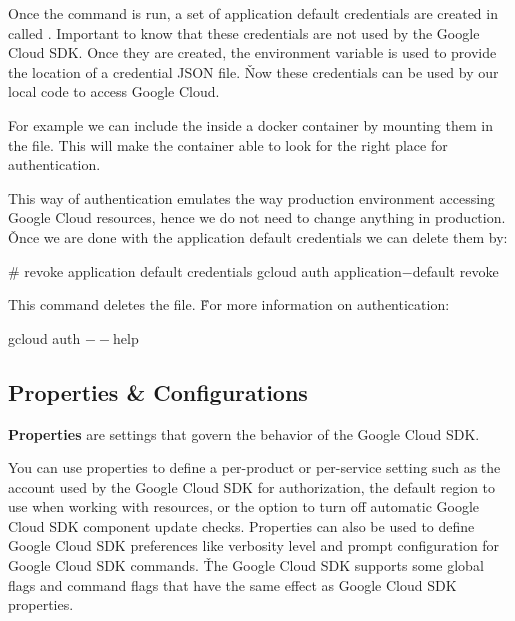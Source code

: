 Once the command is run, a set of application default credentials are created in 
called . Important to know that these credentials are not used by the
Google Cloud SDK. Once they are created, the  environment variable is used to
provide the location of a credential JSON file. \v

Now these credentials can be used by our local code to access Google Cloud.

\be
For example we can include the  inside a docker container by mounting them
in the  file. This will make the container able to look for the right place for authentication.
\ee

This way of authentication emulates the way production environment accessing Google Cloud resources, hence we do not
need to change anything in production. \v

Once we are done with the application default credentials we can delete them by:
\begin{bash}
# revoke application default credentials
gcloud auth application$-$default revoke
\end{bash}

This command deletes the  file. \v

For more information on authentication:
\begin{bash}
gcloud auth $--$help
\end{bash}

\subsection{Properties \& Configurations}

\bd[Properties]
\textbf{Properties} are settings that govern the behavior of the Google Cloud SDK.
\ed

You can use properties to define a per-product or per-service setting such as the account used by the Google Cloud SDK
for authorization, the default region to use when working with resources, or the option to turn off automatic Google
Cloud SDK component update checks. Properties can also be used to define Google Cloud SDK preferences like verbosity
level and prompt configuration for Google Cloud SDK commands. \v

The Google Cloud SDK supports some global flags and command flags that have the same effect as Google Cloud SDK
properties.

